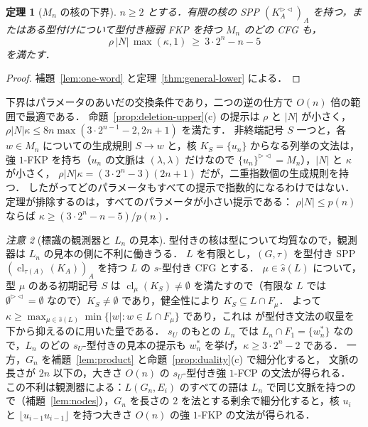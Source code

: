 \documentclass[11pt,a4paper]{ltjsarticle}
\numberwithin{equation}{section}
\theoremstyle{plain}
\newtheorem{theorem}{定理}[section]
\theoremstyle{definition}
\theoremstyle{remark}
\newtheorem{remark}[theorem]{注意}
\theoremstyle{plain}
\newcommand{\eps}{\lambda}
\newcommand{\RL}{^{\rhd\lhd}}
\newcommand{\cl}{\operatorname{cl}}
\newcommand{\Lfl}{\lfloor}
\newcommand{\Rfl}{\rfloor}
\begin{document}
\begin{theorem}[$M_n$ の核の下界]\label{thm:deletion}
$n\ge2$ とする．有限の核の SPP $(K_A\RL)_A$ を持つ，またはある型付けについて型付き極弱 FKP を持つ $M_n$ のどの CFG も，
\[
\rho\,|N|\,\max(\kappa,1)\ \ge\ 3\cdot2^n-n-5
\]
を満たす．
\end{theorem}
\begin{proof}
補題~\ref{lem:one-word} と定理~\ref{thm:general-lower} による．
\end{proof}

下界はパラメータのあいだの交換条件であり，二つの逆の仕方で $O(n)$ 倍の範囲で最適である．
命題~\ref{prop:deletion-upper}(c) の提示は $\rho$ と $|N|$ が小さく，$\rho|N|\kappa\le8n\max(3\cdot2^{n-1}-2,2n+1)$ を満たす．
非終端記号 $S$ 一つと，各 $w\in M_n$ についての生成規則 $S\to w$ と，核 $K_S=\{u_n\}$ からなる列挙の文法は，
強 $1$-FKP を持ち（$u_n$ の文脈は $(\eps,\eps)$ だけなので $\{u_n\}\RL=M_n$），$|N|$ と $\kappa$ が小さく，
$\rho|N|\kappa=(3\cdot2^n-3)(2n+1)$ だが，二重指数個の生成規則を持つ．
したがってどのパラメータもすべての提示で指数的になるわけではない．定理が排除するのは，すべてのパラメータが小さい提示である：
$\rho|N|\le p(n)$ ならば $\kappa\ge(3\cdot2^n-n-5)/p(n)$．


\begin{remark}[標識の観測器と $L_n$ の見本]\label{rem:Ln-sU}
型付きの核は型について均質なので，観測器は $L_n$ の見本の側に不利に働きうる．
$L$ を有限とし，$(G,\tau)$ を型付き SPP $(\cl_{\tau(A)}(K_A))_A$ を持つ $L$ の $s$-型付き CFG とする．
$\mu\in\widehat s(L)$ について，型 $\mu$ のある初期記号 $S$ は $\cl_\mu(K_S)\ne\emptyset$ を満たすので（有限な $L$ では $\emptyset\RL=\emptyset$ なので）$K_S\ne\emptyset$ であり，健全性により $K_S\subseteq L\cap F_\mu$．
よって $\kappa\ge\max_{\mu\in\widehat s(L)}\min\{|w|:w\in L\cap F_\mu\}$ であり，これは
\citet[式~($\spadesuit$)，Cor.~6.6]{kuriyama-tcs1} が型付き文法の収量を下から抑えるのに用いた量である．
$s_U$ のもとの $L_n$ では $L_n\cap F_1=\{w^*_n\}$ なので，$L_n$ のどの $s_U$-型付きの見本の提示も $w^*_n$ を挙げ，$\kappa\ge3\cdot2^n-2$ である．
一方，$G_n$ を補題~\ref{lem:product} と命題~\ref{prop:duality}(c) で細分化すると，
文脈の長さが $2n$ 以下の，大きさ $O(n)$ の $s_U$-型付き強 $1$-FCP の文法が得られる．
この不利は観測器による：$L(G_n,E_i)$ のすべての語は $L_n$ で同じ文脈を持つので（補題~\ref{lem:nodes}），$G_n$ を長さの $2$ を法とする剰余で細分化すると，核 $u_i$ と $\Lfl u_{i-1}u_{i-1}\Rfl$ を持つ大きさ $O(n)$ の強 $1$-FKP の文法が得られる．
\end{remark}
\end{document}

